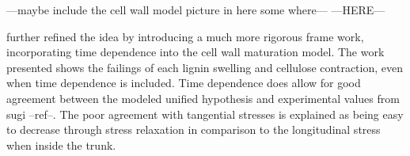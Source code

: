 ---maybe include the cell wall model picture in here some where---
---HERE---


\cite{Yamamoto_1998} further refined the idea by introducing a much more rigorous frame
work, incorporating time dependence into the cell wall maturation model. The
work presented shows the failings of each lignin swelling and cellulose
contraction, even when time dependence is included. Time dependence does allow
for good agreement between the modeled unified hypothesis and experimental
values from sugi --ref--. The poor agreement with tangential stresses is
explained as being easy to decrease through stress relaxation in comparison to
the longitudinal stress when inside the trunk.
